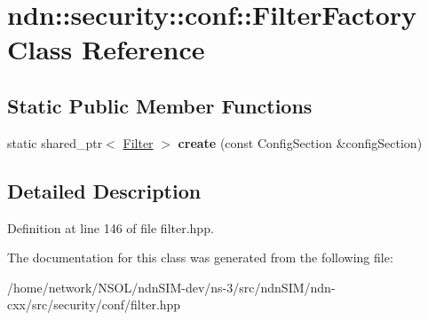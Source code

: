 \hypertarget{classndn_1_1security_1_1conf_1_1FilterFactory}{}\section{ndn\+:\+:security\+:\+:conf\+:\+:Filter\+Factory Class Reference}
\label{classndn_1_1security_1_1conf_1_1FilterFactory}
\subsection*{Static Public Member Functions}
\begin{DoxyCompactItemize}
\item 
static shared\+\_\+ptr$<$ \hyperlink{classndn_1_1security_1_1conf_1_1Filter}{Filter} $>$ {\bfseries create} (const Config\+Section \&config\+Section)\hypertarget{classndn_1_1security_1_1conf_1_1FilterFactory_a84b61dfcfb51a4d954dd3c6164da7169}{}\label{classndn_1_1security_1_1conf_1_1FilterFactory_a84b61dfcfb51a4d954dd3c6164da7169}

\end{DoxyCompactItemize}


\subsection{Detailed Description}


Definition at line 146 of file filter.\+hpp.



The documentation for this class was generated from the following file\+:\begin{DoxyCompactItemize}
\item 
/home/network/\+N\+S\+O\+L/ndn\+S\+I\+M-\/dev/ns-\/3/src/ndn\+S\+I\+M/ndn-\/cxx/src/security/conf/filter.\+hpp\end{DoxyCompactItemize}

